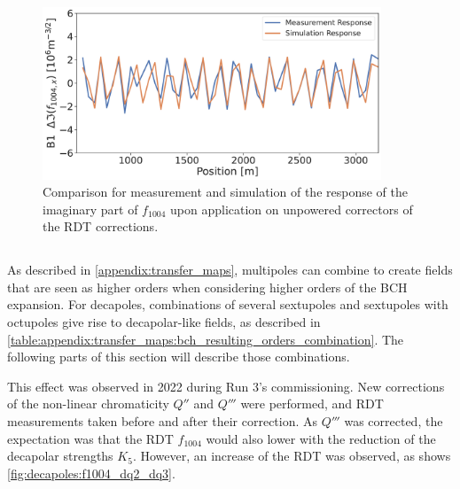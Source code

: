 \begin{figure}[!htb]
    \centering
    \includegraphics[width=0.9\textwidth]{./images/f1004/b1_response_rdt_corr.pdf}
    \caption{Comparison for measurement and simulation of the response of the imaginary part of
    $f_{1004}$ upon application on unpowered correctors of the RDT corrections.}
    \label{fig:decapoles:rdt:b1_response_corr}
\end{figure}



\FloatBarrier
\subsection{}
\label{section:decapoles:feed_up}


\subsubsection{}

As described in \cref{appendix:transfer_maps}, multipoles can combine to create fields that are seen
as higher orders when considering higher orders of the BCH expansion.
For decapoles, combinations of several sextupoles and sextupoles with octupoles give rise to
decapolar-like fields, as described in
\cref{table:appendix:transfer_maps:bch_resulting_orders_combination}. The following parts of this
section will describe those combinations.

This effect was observed in 2022 during Run 3's commissioning. New corrections of the non-linear
chromaticity $Q''$ and $Q'''$ were performed, and RDT measurements taken before and after their
correction. As $Q'''$ was corrected, the expectation was that the RDT $f_{1004}$ would also lower
with the reduction of the decapolar strengths $K_5$. However, an increase of the RDT was observed,
as shows \cref{fig:decapoles:f1004_dq2_dq3}.

